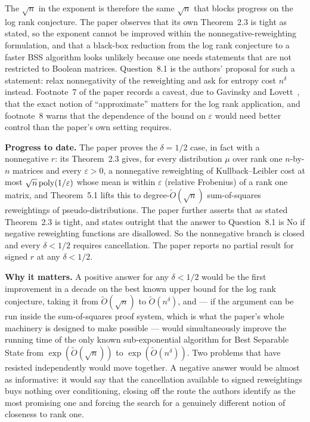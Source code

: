 \documentclass{aicr-conjecture}
\newcommand{\Ot}{\tilde{O}}
\begin{document}
The $\sqrt{n}$ in the exponent is therefore the same $\sqrt{n}$ that
blocks progress on the log rank conjecture. The paper observes that
its own Theorem~2.3 is tight as stated, so the exponent cannot be
improved within the nonnegative-reweighting formulation, and that a
black-box reduction from the log rank conjecture to a faster BSS
algorithm looks unlikely because one needs statements that are not
restricted to Boolean matrices. Question~8.1 is the authors' proposal
for such a statement: relax nonnegativity of the reweighting and ask
for entropy cost $n^{\delta}$ instead. Footnote~7 of the paper records
a caveat, due to Gavinsky and Lovett~\cite{GL14}, that the exact
notion of ``approximate'' matters for the log rank application, and
footnote~8 warns that the dependence of the bound on $\varepsilon$
would need better control than the paper's own setting requires.

\textbf{Progress to date.} The paper proves the $\delta = 1/2$ case,
in fact with a nonnegative $r$: its Theorem~2.3 gives, for every
distribution $\mu$ over rank one $n$-by-$n$ matrices and every
$\varepsilon > 0$, a nonnegative reweighting of Kullback--Leibler cost
at most $\sqrt{n}\,\mathrm{poly}(1/\varepsilon)$ whose mean is within
$\varepsilon$ (relative Frobenius) of a rank one matrix, and
Theorem~5.1 lifts this to degree-$\Ot(\sqrt{n})$ sum-of-squares
reweightings of pseudo-distributions. The paper further asserts that
as stated Theorem~2.3 is tight, and states outright that the answer to
Question~8.1 is No if negative reweighting functions are disallowed.
So the nonnegative branch is closed and every $\delta < 1/2$ requires
cancellation. The paper reports no partial result for signed $r$ at
any $\delta < 1/2$.

\textbf{Why it matters.} A positive answer for any $\delta < 1/2$
would be the first improvement in a decade on the best known upper
bound for the log rank conjecture, taking it from $\Ot(\sqrt{n})$ to
$\Ot(n^{\delta})$, and --- if the argument can be run inside the
sum-of-squares proof system, which is what the paper's whole machinery
is designed to make possible --- would simultaneously improve the
running time of the only known sub-exponential algorithm for Best
Separable State from $\exp(\Ot(\sqrt{n}))$ to $\exp(\Ot(n^{\delta}))$.
Two problems that have resisted independently would move together. A
negative answer would be almost as informative: it would say that the
cancellation available to signed reweightings buys nothing over
conditioning, closing off the route the authors identify as the most
promising one and forcing the search for a genuinely different notion
of closeness to rank one.
\end{document}
